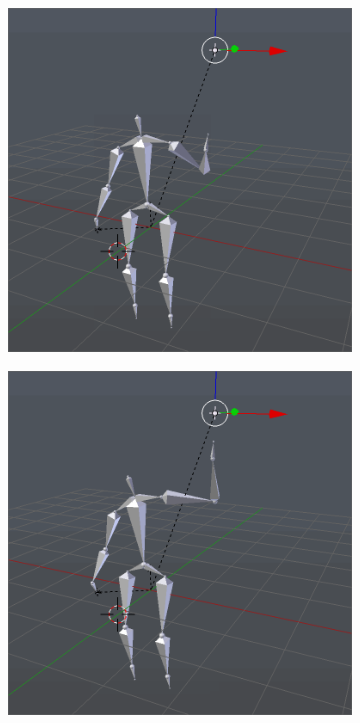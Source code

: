 \documentclass[10pt,twocolumn,letterpaper]{article}
\begin{document}
\begin{figure}[h]
\begin{subfigure}{0.2\textwidth}
        \centering
        \includegraphics[width=.9\linewidth]{raise-linear-2.png}
    \end{subfigure}\begin{subfigure}{0.2\textwidth}
        \centering
        \includegraphics[width=.9\linewidth]{raise-linear-3.png}
    \end{subfigure}\begin{subfigure}{0.2\textwidth}

\end{subfigure}
\end{figure}
\end{document}
